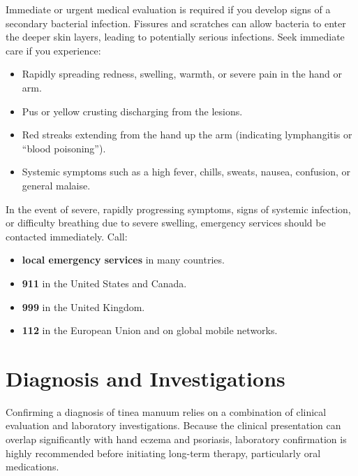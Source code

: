 Immediate or urgent medical evaluation is required if you develop signs of a secondary bacterial infection. Fissures and scratches can allow bacteria to enter the deeper skin layers, leading to potentially serious infections. Seek immediate care if you experience:
\begin{itemize}
    \item Rapidly spreading redness, swelling, warmth, or severe pain in the hand or arm.
    \item Pus or yellow crusting discharging from the lesions.
    \item Red streaks extending from the hand up the arm (indicating lymphangitis or ``blood poisoning'').
    \item Systemic symptoms such as a high fever, chills, sweats, nausea, confusion, or general malaise.
\end{itemize}

In the event of severe, rapidly progressing symptoms, signs of systemic infection, or difficulty breathing due to severe swelling, emergency services should be contacted immediately. Call:
\begin{itemize}
    \item \textbf{local emergency services} in many countries.
    \item \textbf{911} in the United States and Canada.
    \item \textbf{999} in the United Kingdom.
    \item \textbf{112} in the European Union and on global mobile networks.
\end{itemize}

\section*{Diagnosis and Investigations}
Confirming a diagnosis of tinea manuum relies on a combination of clinical evaluation and laboratory investigations. Because the clinical presentation can overlap significantly with hand eczema and psoriasis, laboratory confirmation is highly recommended before initiating long-term therapy, particularly oral medications.

